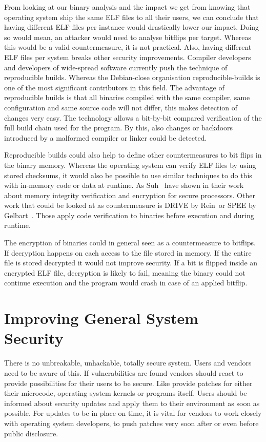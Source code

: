 From looking at our binary analysis and the impact we get from knowing that
operating system ship the same ELF files to all their users, we can conclude
that having different ELF files per instance would drastically lower our impact.
Doing so would mean, an attacker would need to analyse bitflips per target.
Whereas this would be a valid countermeasure, it is not practical. Also, having
different ELF files per system breaks other security improvements. Compiler
developers and developers of wide-spread software currently push the technique
of reproducible builds. Whereas the Debian-close organisation
reproducible-builds\cite{reprobuilds} is one of the most significant
contributors in this field. The advantage of reproducible builds is that all
binaries compiled with the same compiler, same configuration and same
source code will not differ, this makes detection of changes very easy. The
technology allows a bit-by-bit compared verification of the full build chain
used for the program. By this, also changes or backdoors introduced by a
malformed compiler or linker could be detected.

Reproducible builds could also help to define other countermeasures to bit flips
in the binary memory. Whereas the operating system can verify ELF files by using
stored checksums, it would also be possible to use similar techniques to do this
with in-memory code or data at runtime. As Suh~\etal\cite{memintegrity} have
shown in their work about memory integrity verification and encryption for
secure processors. Other work that could be looked at as countermeasure is
DRIVE\cite{drive} by Rein~\etal or SPEE\cite{spee} by Gelbart~\etal. Those apply
code verification to binaries before execution and during runtime.

The encryption of binaries could in general seen as a countermeasure to
bitflips. If decryption happens on each access to the file stored in memory. If
the entire file is stored decrypted it would not improve security. If a bit is
flipped inside an encrypted ELF file, decryption is likely to fail, meaning the
binary could not continue execution and the program would crash in case of an
applied bitflip.

\section{Improving General System Security}

There is no unbreakable, unhackable, totally secure system. Users and vendors
need to be aware of this. If vulnerabilities are found vendors should react to
provide possibilities for their users to be secure. Like provide patches for
either their microcode, operating system kernels or programs itself. Users
should be informed about security updates and apply them to their environment
as soon as possible. For updates to be in place on time, it is vital for
vendors to work closely with operating system developers, to push patches very
soon after or even before public disclosure.

